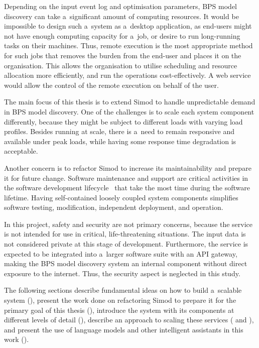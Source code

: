 \documentclass[12pt]{article}
\begin{document}
Depending on the input event log and optimisation parameters, BPS model discovery can take a~significant amount of computing resources. It would be impossible to design such a~system as a~desktop application, as end-users might not have enough computing capacity for a~job, or desire to run long-running tasks on their machines. Thus, remote execution is the most appropriate method for such jobs that removes the burden from the end-user and places it on the organisation. This allows the organisation to utilise scheduling and resource allocation more efficiently, and run the operations cost-effectively. A web service would allow the control of the remote execution on behalf of the user. 

The main focus of this thesis is to extend Simod to handle unpredictable demand in BPS model discovery. One of the challenges is to scale each system component differently, because they might be subject to different loads with varying load profiles. Besides running at scale, there is a~need to remain responsive and available under peak loads, while having some response time degradation is acceptable.

Another concern is to refactor Simod to increase its maintainability and prepare it for future change. 
Software maintenance and support are critical activities in the software development lifecycle~\cite[ch.~5]{bourque_guide_2014} that take the most time during the software lifetime. 
Having self-contained loosely coupled system components simplifies software testing, modification, independent deployment, and operation.

In this project, safety and security are not primary concerns, because the service is not intended for use in critical, life-threatening situations. The input data is not considered private at this stage of development. Furthermore, the service is expected to be integrated into a~larger software suite with an API gateway, making the BPS model discovery system an internal component without direct exposure to the internet. Thus, the security aspect is neglected in this study.

The following sections  describe fundamental ideas on how to build a~scalable system (), present the work done on refactoring Simod to prepare it for the primary goal of this thesis (), introduce the system with its components at different levels of detail (), describe an approach to scaling these services ( and ), and present the use of language models and other intelligent assistants in this work ().
\end{document}
